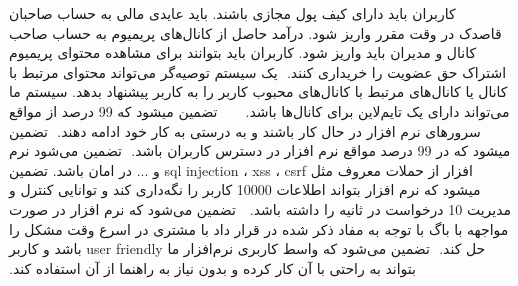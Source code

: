 ‫
‫
‫
‫ کاربران باید دارای کیف پول مجازی باشند.
‫ باید عایدی مالی به حساب صاحبان قاصدک در وقت مقرر واریز شود.
‫ درآمد حاصل از کانال‌های پریمیوم به حساب صاحب کانال و مدیران باید واریز شود.
‫ کاربران باید بتوانند برای مشاهده محتوای پریمیوم اشتراک حق عضویت را خریداری کنند.
‫
‫ یک سیستم توصیه‌گر می‌تواند محتوای مرتبط با کانال یا کانال‌های مرتبط با کانال‌های محبوب کاربر را به کاربر پیشنهاد بدهد.
‫ سیستم ما می‌تواند دارای یک تایم‌لاین برای کانال‌ها باشد.
‫
‫‫
‫
‫
‫
‫تضمین میشود که 99 درصد از مواقع سرورهای نرم افزار در حال کار باشند و به درستی به کار خود ادامه دهند.
‫
‫تضمین میشود که در 99 درصد مواقع نرم افزار در دسترس کاربران باشد.
‫
‫تضمین می‌شود نرم افزار از حملات معروف مثل sql injection ، xss ، csrf و ...  در امان باشد.
‫تضمین میشود که نرم افزار بتواند اطلاعات 10000 کاربر را نگه‌داری کند و توانایی کنترل و مدیریت 10  درخواست در ثانیه را داشته باشد.
‫
‫ تضمین می‌شود که نرم افزار در صورت مواجهه با باگ با توجه به مفاد ذکر شده در قرار داد با مشتری در اسرع وقت مشکل را حل کند.
‫
‫تضمین می‌شود که واسط کاربری نرم‌افزار ما user friendly باشد و کاربر بتواند به راحتی با آن کار کرده و بدون نیاز به راهنما از آن استفاده کند.
‫
